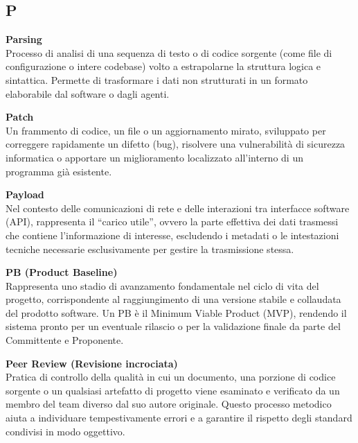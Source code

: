 \documentclass[12pt, a4paper]{article}
\begin{document}
\subsection*{P}
{}
\vspace{0.2cm}

\noindent\hypertarget{parsing}{\textbf{Parsing}} \\[0.1em]
Processo di analisi di una sequenza di testo o di codice sorgente (come file di configurazione o intere codebase) volto a estrapolarne la struttura logica e sintattica. Permette di trasformare i dati non strutturati in un formato elaborabile dal software o dagli agenti.
\vspace{0.5cm}

\noindent\hypertarget{patch}{\textbf{Patch}} \\[0.1em]
Un frammento di codice, un file o un aggiornamento mirato, sviluppato per correggere rapidamente un difetto (bug), risolvere una vulnerabilità di sicurezza informatica o apportare un miglioramento localizzato all'interno di un programma già esistente.
\vspace{0.5cm}

\noindent\hypertarget{payload}{\textbf{Payload}} \\[0.1em]
Nel contesto delle comunicazioni di rete e delle interazioni tra interfacce software (API), rappresenta il ``carico utile'', ovvero la parte effettiva dei dati trasmessi che contiene l'informazione di interesse, escludendo i metadati o le intestazioni tecniche necessarie esclusivamente per gestire la trasmissione stessa.
\vspace{0.5cm}

\noindent\hypertarget{pb}{\textbf{PB (Product Baseline)}} \\[0.1em]
Rappresenta uno stadio di avanzamento fondamentale nel ciclo di vita del progetto, corrispondente al raggiungimento di una versione stabile e collaudata del prodotto software. Un PB è il Minimum Viable Product (MVP), rendendo il sistema pronto per un eventuale rilascio o per la validazione finale da parte del Committente e Proponente.
\vspace{0.5cm}

\noindent\hypertarget{peer-review}{\textbf{Peer Review (Revisione incrociata)}} \\[0.1em]
Pratica di controllo della qualità in cui un documento, una porzione di codice sorgente o un qualsiasi artefatto di progetto viene esaminato e verificato da un membro del team diverso dal suo autore originale. Questo processo metodico aiuta a individuare tempestivamente errori e a garantire il rispetto degli standard condivisi in modo oggettivo.
\vspace{0.5cm}
\end{document}
